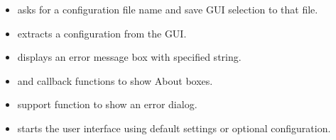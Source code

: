\begin{itemize}
\item {} asks for a configuration file name and save GUI selection to that file.
\item {} extracts a configuration from the GUI.
\item {} displays an error message box with specified string.
\item {} and  callback functions to show About boxes.
\item {} support function to show an error dialog.
\item {} starts the user interface using default settings or optional configuration.
\end{itemize}
